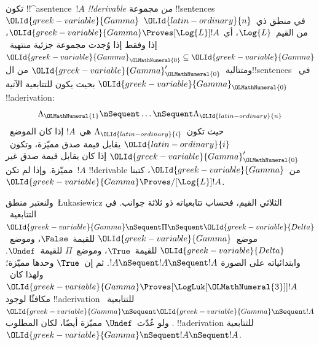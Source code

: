 \documentclass[../../../include/open-logic-section]{subfiles}
\begin{document}
\begin{defn}[!!^{derivability}]
تكون !!^a{sentence}~$!A$ \emph{!!{derivable} من} مجموعة
!!{sentence}s~$\OLId{greek-variable}{Gamma}$ في منطق ذي~$\OLId{latin-ordinary}{n}$ من القيم~$\Log{L}$، أي
$\OLId{greek-variable}{Gamma} \Proves[\Log{L}] !A$، إذا وفقط إذا وُجدت مجموعة جزئية
منتهية~$\OLId{greek-variable}{Gamma}_\OLMathNumeral{0} \subseteq \OLId{greek-variable}{Gamma}$ ومتتالية~$\OLId{greek-variable}{Gamma}_\OLMathNumeral{0}'$ من
ال!!{sentence}s في~$\OLId{greek-variable}{Gamma}_\OLMathNumeral{0}$ بحيث يكون للتتابعية الآتية
!!a{derivation}:
\[ \Lambda_\OLMathNumeral{1} \nSequent \dots \nSequent \Lambda_\OLId{latin-ordinary}{n} \]
حيث تكون~$\Lambda_\OLId{latin-ordinary}{i}$ هي~$!A$ إذا كان الموضع~$\OLId{latin-ordinary}{i}$ يقابل قيمة صدق
مميّزة، وتكون~$\OLId{greek-variable}{Gamma}_\OLMathNumeral{0}'$ إذا كان يقابل قيمة صدق غير مميّزة. وإذا لم
تكن~$!A$ !!{derivable} من~$\OLId{greek-variable}{Gamma}$، كتبنا
$\OLId{greek-variable}{Gamma} \Proves/[\Log{L}] !A$.
\end{defn}

ولنعتبر منطق~\L ukasiewicz الثلاثي القيم، فحساب تتابعياته ذو ثلاثة
جوانب. في التتابعية~$\OLId{greek-variable}{Gamma} \nSequent \Pi \nSequent \OLId{greek-variable}{Delta}$
موضع~$\OLId{greek-variable}{Gamma}$ للقيمة~$\False$، وموضع~$\OLId{greek-variable}{Delta}$ للقيمة~$\True$،
وموضع~$\Pi$ للقيمة~$\Undef$. وابتدائياته على الصورة
$!A \nSequent !A \nSequent !A$. ثم إن~$\True$ وحدها مميّزة؛
ولهذا كان~$\OLId{greek-variable}{Gamma} \Proves[\LogLuk[\OLMathNumeral{3}]] !A$ مكافئًا لوجود
!!a{derivation} للتتابعية~$\OLId{greek-variable}{Gamma} \nSequent \OLId{greek-variable}{Gamma} \nSequent !A$.
ولو عُدّت~$\Undef$ مميّزة أيضًا، لكان المطلوب !!a{derivation}
للتتابعية~$\OLId{greek-variable}{Gamma} \nSequent !A \nSequent !A$.
\end{document}
